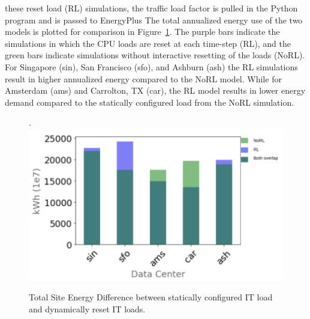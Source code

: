  these reset load (RL) simulations,  the traffic load factor is pulled in  the Python program and is passed to EnergyPlus  The total annualized energy use of the two models is plotted for comparison in Figure~\ref{fig:total_energy_comp}. The purple bars indicate the simulations in which the CPU loads are reset at each time-step (RL), and the green bars indicate simulations without interactive resetting of the loads (NoRL). For Singapore (sin), San Francisco (sfo), and Ashburn (ash) the RL simulations result in higher annualized energy compared to the NoRL model. While for Amsterdam (ams) and Carrolton, TX (car), the RL model results in lower energy demand compared to the statically configured load from the NoRL simulation.

\begin{figure}.
  \centering
  \includegraphics[scale=0.275]{building_energy_model/img/cpu_comps_3legend.png}
  \caption[Comparison of energy demand for two models]{Total Site Energy Difference between statically configured IT load and dynamically reset IT loads.}
  \label{fig:total_energy_comp}
  \end{figure}

